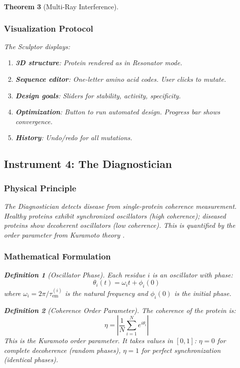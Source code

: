 \documentclass[11pt,a4paper]{article}
\newtheorem{theorem}{Theorem}[section]
\newtheorem{definition}[theorem]{Definition}
\begin{document}
\begin{theorem}[Multi-Ray Interference]
\subsubsection{Visualization Protocol}

The Sculptor displays:
\begin{enumerate}
\item \textbf{3D structure}: Protein rendered as in Resonator mode.
\item \textbf{Sequence editor}: One-letter amino acid codes. User clicks to mutate.
\item \textbf{Design goals}: Sliders for stability, activity, specificity.
\item \textbf{Optimization}: Button to run automated design. Progress bar shows convergence.
\item \textbf{History}: Undo/redo for all mutations.
\end{enumerate}

\subsection{Instrument 4: The Diagnostician}

\subsubsection{Physical Principle}

The Diagnostician detects disease from single-protein coherence measurement. Healthy proteins exhibit synchronized oscillators (high coherence); diseased proteins show decoherent oscillators (low coherence). This is quantified by the order parameter from Kuramoto theory \cite{Kuramoto1975}.

\subsubsection{Mathematical Formulation}

\begin{definition}[Oscillator Phase]
Each residue $i$ is an oscillator with phase:
\begin{equation}
\theta_i(t) = \omega_i t + \phi_i(0)
\end{equation}
where $\omega_i = 2\pi/\tau_{\text{em}}^{(i)}$ is the natural frequency and $\phi_i(0)$ is the initial phase.
\end{definition}

\begin{definition}[Coherence Order Parameter]
The coherence of the protein is:
\begin{equation}
\eta = \left| \frac{1}{N} \sum_{i=1}^N e^{i\theta_i} \right|
\end{equation}
This is the Kuramoto order parameter. It takes values in $[0,1]$: $\eta = 0$ for complete decoherence (random phases), $\eta = 1$ for perfect synchronization (identical phases).
\end{definition}


\end{theorem}
\end{document}
